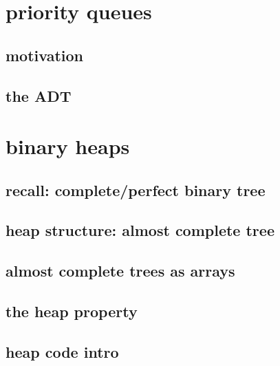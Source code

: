 
\begin{frame}
    \titlepage
\end{frame}

\section{priority queues}

\subsection{motivation}



\subsection{the ADT}



\section{binary heaps}



\subsection{recall: complete/perfect binary tree}



\subsection{heap structure: almost complete tree}



\subsection{almost complete trees as arrays}



\subsection{the heap property}



\subsection{heap code intro}

